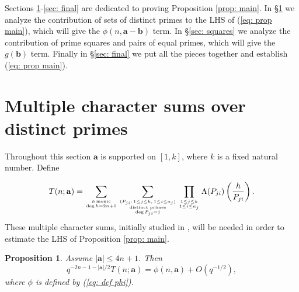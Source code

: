 \documentclass[alphabetic, 
        colorlinks,
        linkcolor=red,  citecolor=blue,
        backref
]{amsart}
\numberwithin{equation}{section}
\newtheorem{prop}[claim]{Proposition}
\theoremstyle{definition}
\begin{document}
Sections \ref{sec: distinct primes}-\ref{sec: final} are dedicated to proving Proposition \ref{prop: main}. In \S\ref{sec: distinct primes} we analyze the contribution of sets of distinct primes to the LHS of (\ref{eq: prop main}), which will give the $\phi(n,\mathbf a-\mathbf b)$ term. In \S\ref{sec: squares} we analyze the contribution of prime squares and pairs of equal primes, which will give the $g(\mathbf b)$ term. Finally in \S\ref{sec: final} we put all the pieces together and establish (\ref{eq: prop main}).


\section{Multiple character sums over distinct primes}
\label{sec: distinct primes}

 Throughout this section $\mathbf a$ is supported on $[1,k]$, where $k$ is a fixed natural number. Define

\begin{equation}\label{eq: def T}
T(n;\mathbf a)=\sum_{h\,\mathrm{monic}\atop{\deg h=2n+1}}\sum_{(P_{ji}:\,1\le j\le k,\,1\le i\le a_j)\atop{\text {distinct primes}\atop{\deg P_{ji}=j}}}\prod_{1\le j\le k\atop{1\le i\le a_j}}\Lambda(P_{ji})\left(\frac h{P_{ji}}\right).
\end{equation}
These multiple character sums, initially studied in \cite{ERR13}, will be needed in order to estimate the LHS of Proposition \ref{prop: main}.

\begin{prop}\label{prop_S_sum_estimate}
Assume $|\mathbf a|\le 4n+1$. Then
\begin{equation*}
    q^{-2n-1-|\mathbf a|/2}T(n;\mathbf a)=\phi(n,\mathbf a)+O\left(q^{-1/2}\right),
\end{equation*}
where $\phi$ is defined by (\ref{eq: def phi}).

\end{prop}
\end{document}
